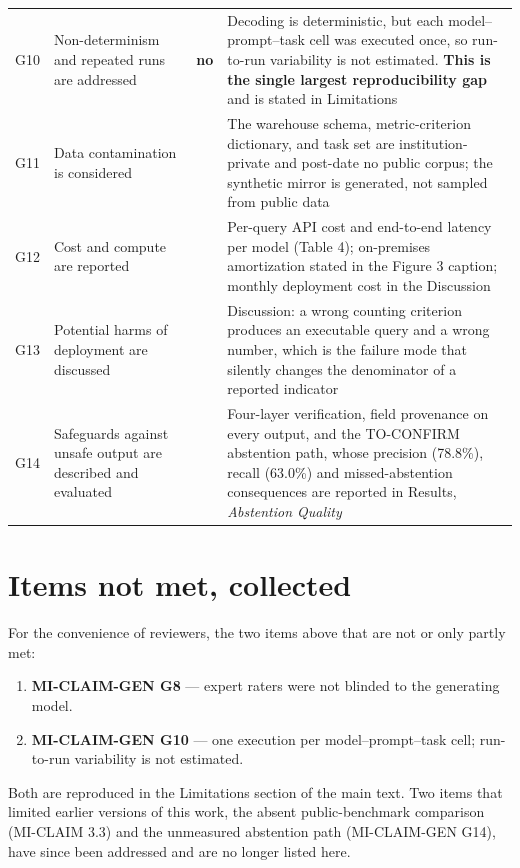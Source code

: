 \documentclass[10pt]{article}
\newcommand{\Y}{\checkmark}
\begin{document}
\begin{longtable}{@{}L{0.7cm}L{7.4cm}C{1.4cm}L{5.4cm}@{}}
G10 & Non-determinism and repeated runs are addressed & \textbf{no} & Decoding is deterministic, but each model--prompt--task cell was executed once, so run-to-run variability is not estimated. \textbf{This is the single largest reproducibility gap} and is stated in Limitations\\
G11 & Data contamination is considered & \Y & The warehouse schema, metric-criterion dictionary, and task set are institution-private and post-date no public corpus; the synthetic mirror is generated, not sampled from public data\\
G12 & Cost and compute are reported & \Y & Per-query API cost and end-to-end latency per model (Table 4); on-premises amortization stated in the Figure 3 caption; monthly deployment cost in the Discussion\\
G13 & Potential harms of deployment are discussed & \Y & Discussion: a wrong counting criterion produces an executable query and a wrong number, which is the failure mode that silently changes the denominator of a reported indicator\\
G14 & Safeguards against unsafe output are described and evaluated & \Y & Four-layer verification, field provenance on every output, and the TO-CONFIRM abstention path, whose precision (78.8\%), recall (63.0\%) and missed-abstention consequences are reported in Results, \emph{Abstention Quality}\\
\end{longtable}
\endgroup

\section{Items not met, collected}
\noindent
For the convenience of reviewers, the two items above that are not or only partly met:

\begin{enumerate}[leftmargin=1.5em,itemsep=2pt,topsep=3pt]
  \item \textbf{MI-CLAIM-GEN G8} --- expert raters were not blinded to the
        generating model.
  \item \textbf{MI-CLAIM-GEN G10} --- one execution per model--prompt--task
        cell; run-to-run variability is not estimated.
\end{enumerate}

\noindent
Both are reproduced in the Limitations section of the main text. Two items that limited earlier versions of this work, the absent public-benchmark comparison (MI-CLAIM 3.3) and the unmeasured abstention path (MI-CLAIM-GEN G14), have since been addressed and are no longer listed here.
\end{document}
